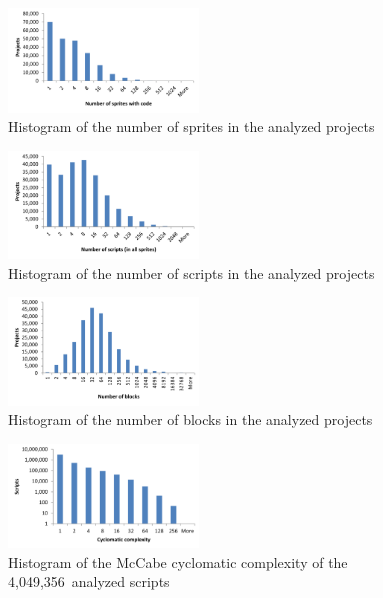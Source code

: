 \documentclass{sig-alternate}
\newcommand{\nscripts}{4,049,356}
\begin{document}
\begin{figure}
	\centering
	\includegraphics[width=0.45\textwidth]{fig/charts/1sprites}
	\caption{Histogram of the number of sprites in the analyzed projects}
	\label{fig:size-sprites}
\end{figure}
\begin{figure}
	\centering
	\includegraphics[width=0.45\textwidth]{fig/charts/1scripts}
	\caption{Histogram of the number of scripts in the analyzed projects}
	\label{fig:size-scripts}
\end{figure}
\begin{figure}
	\centering
	\includegraphics[width=0.45\textwidth]{fig/charts/1locs}
	\caption{Histogram of the number of blocks in the analyzed projects}
	\label{fig:size-locs}
\end{figure}
\begin{figure}
	\centering
	\includegraphics[width=0.45\textwidth]{fig/charts/3cyclomatic}
	\caption{Histogram of the McCabe cyclomatic complexity of the \nscripts~analyzed scripts}
	\label{fig:cyclomatic}
\end{figure}
\end{document}
